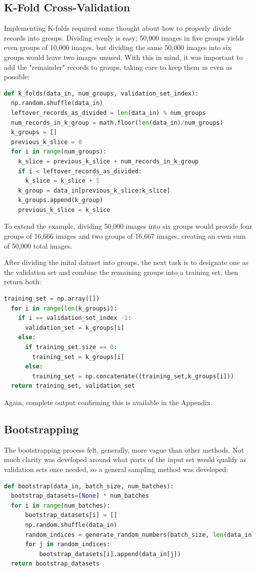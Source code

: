 \documentclass{article}
\begin{document}
\subsection{K-Fold Cross-Validation} \label{kf}
Implementing K-folds required some thought about how to properly divide records into groups.
Dividing evenly is easy; 50,000 images in five groups yields even groups of 10,000 images, but dividing the same 50,000 images into six groups would leave two images unused.
With this in mind, it was important to add the "remainder" records to groups, taking care to keep them as even as possible:
\begin{lstlisting}[language=Python]
def k_folds(data_in, num_groups, validation_set_index):
  np.random.shuffle(data_in)
  leftover_records_as_divided = len(data_in) % num_groups
  num_records_in_k_group = math.floor(len(data_in)/num_groups)
  k_groups = []
  previous_k_slice = 0
  for i in range(num_groups):
    k_slice = previous_k_slice + num_records_in_k_group
    if i < leftover_records_as_divided:
      k_slice = k_slice + 1
    k_group = data_in[previous_k_slice:k_slice]
    k_groups.append(k_group)
    previous_k_slice = k_slice
\end{lstlisting}

To extend the example, dividing 50,000 images into six groups would provide four groups of 16,666 images and two groups of 16,667 images, creating an even sum of 50,000 total images.

After dividing the inital dataset into groups, the next task is to designate one as the validation set and combine the remaining groups into a training set, then return both:
\begin{lstlisting}[language=Python]
  training_set = np.array([])
  for i in range(len(k_groups)):
    if i == validation_set_index -1:
      validation_set = k_groups[i]
    else:
      if training_set.size == 0:
        training_set = k_groups[i]
      else:
        training_set = np.concatenate((training_set,k_groups[i]))
  return training_set, validation_set
\end{lstlisting}
Again, complete output confirming this is available in the  Appendix.

\subsection{Bootstrapping}
The bootstrapping process felt, generally, more vague than other methods.
Not much clarity was developed around what parts of the input set would qualify as validation sets once needed, so a general sampling method was developed:
\begin{lstlisting}[language=Python]
def bootstrap(data_in, batch_size, num_batches):
  bootstrap_datasets=[None] * num_batches
  for i in range(num_batches):
      bootstrap_datasets[i] = []
      np.random.shuffle(data_in)
      random_indices = generate_random_numbers(batch_size, len(data_in))
      for j in random_indices:
          bootstrap_datasets[i].append(data_in[j])
  return bootstrap_datasets
\end{lstlisting}
\end{document}
